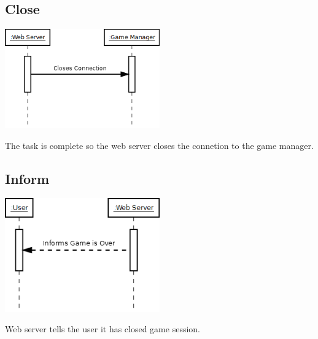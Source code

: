 	\subsection{Close}
	\includegraphics[width=0.50\textwidth]{./Interact8.png}
	
	The task is complete so the web server closes the connetion to the game manager.
	
	\subsection{Inform}
	\includegraphics[width=0.50\textwidth]{./Interact9.png}
	
	Web server tells the user it has closed game session.

\newpage
